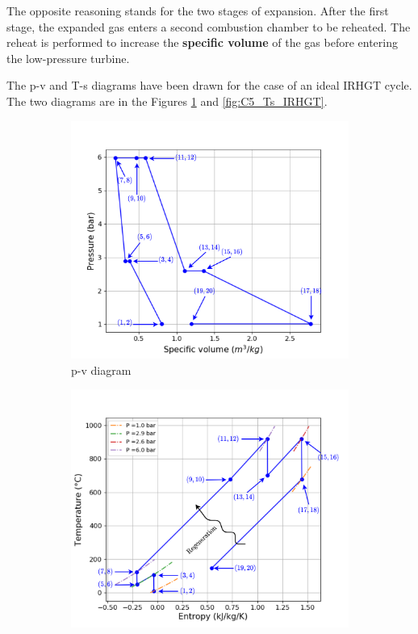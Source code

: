 The opposite reasoning stands for the two stages of expansion. After the first stage, the expanded gas enters a second combustion chamber to be reheated. The reheat is performed to increase the \textbf{specific volume} of the gas before entering the low-pressure turbine. 


The p-v and T-s diagrams have been drawn for the case of an ideal IRHGT cycle. The two diagrams are in the Figures \ref{fig:C5_pv_IRHGT} and \ref{fig:C5_Ts_IRHGT}.

\begin{figure}[h]
     \centering
     \begin{subfigure}[b]{0.4\textwidth}
         \centering
         \includegraphics[width=\textwidth]{pv_IRHGT}
         \caption{p-v diagram}
         \label{fig:C5_pv_IRHGT}
     \end{subfigure}
     \begin{subfigure}[b]{0.4\textwidth}
         \centering
         \includegraphics[width=\textwidth]{Ts_IRHGT}

\end{subfigure}
\end{figure}

